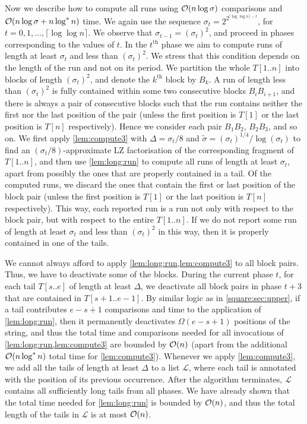 Now we describe how to compute all runs using $\mathcal{O}(n \log \sigma)$ comparisons and $\mathcal{O}(n \log \sigma + n \log^* n)$ time.
We again use the sequence $\sigma_t=2^{2^{\lceil\log\log n\rceil-t}}$, for $t=0,1,\ldots,\lceil\log\log n\rceil$.
We observe that $\sigma_{t-1}=(\sigma_{t})^{2}$, and proceed in phases corresponding to the values of $t$.
In the $t^{\text{th}}$ phase we aim to compute runs of length at least $\sigma_t$ and less than $(\sigma_t)^2$.
We stress that this condition depends on the length of the run and not on its period.
We partition
the whole $T[1..n]$ into blocks of length $(\sigma_{t})^{2}$, and denote the $k^{\text{th}}$ block by $B_{k}$.
A run of length less than $(\sigma_{t})^{2}$ is fully contained within some two consecutive blocks $B_{i}B_{i+1}$, and there is always a pair of consecutive blocks such that the run contains neither the first nor the last position of the pair (unless the first position is $T[1]$ or the last position is $T[n]$ respectively).
Hence we consider each pair $B_{1}B_{2}$, $B_{2}B_{3}$, and so on.
We first apply \cref{lem:compute3} with $\Delta=\sigma_{t}/8$ and $\tilde{\sigma}=(\sigma_{t})^{1/4}/\log(\sigma_{t})$ to find
an $(\sigma_{t}/8)$-approximate LZ factorisation of the corresponding fragment of $T[1..n]$, and then
use \cref{lem:long:run} to compute all runs of length at least $\sigma_t$, apart from possibly the ones that are properly contained in a tail. Of the computed runs, we discard the ones that contain the first or last position of the block pair (unless the first position is $T[1]$ or the last position is $T[n]$ respectively).
This way, each reported run is a run not only with respect to the block pair, but with respect to the entire $T[1..n]$. If we do not report some run of length at least $\sigma_t$ and less than $(\sigma_t)^2$ in this way, then it is properly contained in one of the tails.

We cannot always afford to apply \cref{lem:long:run,lem:compute3} to all block pairs. Thus, we have to deactivate some of the blocks. During the current phase $t$, for each tail $T[s..e]$ of length at least $\Delta$, we deactivate all block pairs in phase $t + 3$ that are contained in $T[s + 1..e - 1]$. By similar logic as in \cref{square:sec:upper}, if a tail contributes $e - s + 1$ comparisons and time to the application of \cref{lem:long:run}, then it permanently deactivates $\Omega(e - s + 1)$ positions of the string, and thus the total time and comparisons needed for all invocations of \cref{lem:long:run,lem:compute3} are bounded by $\mathcal{O}(n)$ (apart from the additional $\mathcal{O}(n \log^* n)$ total time for \cref{lem:compute3}).
Whenever we apply \cref{lem:compute3}, we add all the tails of length at least $\Delta$ to a list $\mathcal L$, where each tail is annotated with the position of its previous occurrence.
After the algorithm terminates, $\mathcal L$ contains all sufficiently long tails from all phases. We have already shown that the total time needed for \cref{lem:long:run} is bounded by $\mathcal{O}(n)$, and thus the total length of the tails in $\mathcal L$ is at most $\mathcal{O}(n)$.

